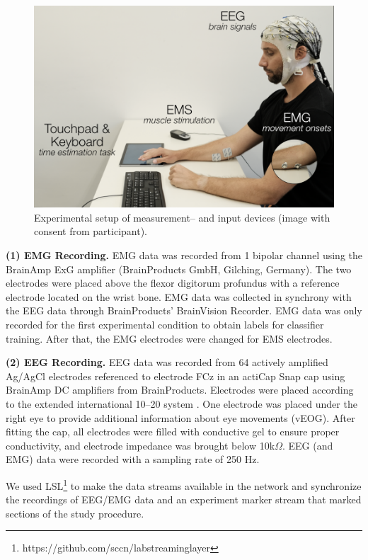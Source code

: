 \begin{figure}[!h]
    \centering
    \includegraphics[width=\columnwidth]{figures/setup_fixed.png}
    \caption{Experimental setup of measurement-- and input devices (image with consent from participant).}
    \label{fig:setup}
\end{figure}

\indent\textbf{(1) EMG Recording.} EMG data was recorded from 1 bipolar channel using the BrainAmp ExG amplifier (BrainProducts GmbH, Gilching, Germany). The two electrodes were placed above the flexor digitorum profundus with a reference electrode located on the wrist bone. EMG data was collected in synchrony with the EEG data through BrainProducts' BrainVision Recorder. EMG data was only recorded for the first experimental condition to obtain labels for classifier training. After that, the EMG electrodes were changed for EMS electrodes.

\indent\textbf{(2) EEG Recording.} EEG data was recorded from 64 actively amplified Ag/AgCl electrodes referenced to electrode FCz in an actiCap Snap cap using BrainAmp DC amplifiers from BrainProducts. Electrodes were placed according to the extended international 10–20 system \cite{Jasper1983-uw}. One electrode was placed under the right eye to provide additional information about eye movements (vEOG). After fitting the cap, all electrodes were filled with conductive gel to ensure proper conductivity, and electrode impedance was brought below 10k$\Omega$. EEG (and EMG) data were recorded with a sampling rate of 250 Hz. 

We used LSL\footnote{https://github.com/sccn/labstreaminglayer} to make the data streams available in the network and synchronize the recordings of EEG/EMG data and an experiment marker stream that marked sections of the study procedure.

